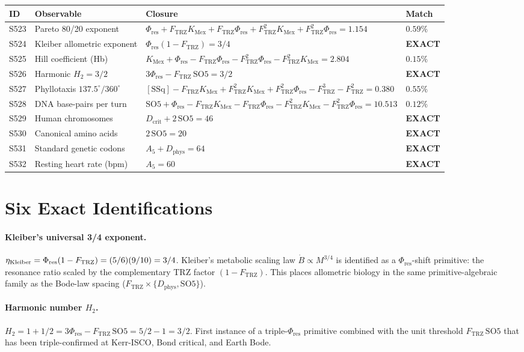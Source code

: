 \documentclass[11pt]{article}
\newcommand{\Ftrz}{F_{\mathrm{TRZ}}}
\newcommand{\Phires}{\Phi_{\mathrm{res}}}
\newcommand{\KMex}{K_{\mathrm{Mex}}}
\newcommand{\Dphys}{D_{\mathrm{phys}}}
\newcommand{\Dcrit}{D_{\mathrm{crit}}}
\newcommand{\SOfive}{\mathrm{SO5}}
\newcommand{\Afive}{A_{5}}
\newcommand{\SSq}{[\mathrm{SSq}]}
\begin{document}
\begin{longtable}{@{}llll@{}}
\toprule
ID & Observable & Closure & Match \\
\midrule
\endhead
S523 & Pareto 80/20 exponent & $\Phires+\Ftrz\KMex+\Ftrz\Phires+\Ftrz^2\KMex+\Ftrz^2\Phires=1.154$ & $0.59\%$ \\
S524 & Kleiber allometric exponent & $\Phires(1-\Ftrz) = 3/4$ & \textbf{EXACT} \\
S525 & Hill coefficient (Hb) & $\KMex+\Phires-\Ftrz\Phires-\Ftrz^2\Phires-\Ftrz^2\KMex=2.804$ & $0.15\%$ \\
S526 & Harmonic $H_2 = 3/2$ & $3\Phires-\Ftrz\,\SOfive = 3/2$ & \textbf{EXACT} \\
S527 & Phyllotaxis $137.5^\circ/360^\circ$ & $\SSq-\Ftrz\KMex+\Ftrz^2\KMex+\Ftrz^2\Phires-\Ftrz^3-\Ftrz^2=0.380$ & $0.55\%$ \\
S528 & DNA base-pairs per turn & $\SOfive+\Phires-\Ftrz\KMex-\Ftrz\Phires-\Ftrz^2\KMex-\Ftrz^2\Phires=10.513$ & $0.12\%$ \\
S529 & Human chromosomes & $\Dcrit + 2\,\SOfive = 46$ & \textbf{EXACT} \\
S530 & Canonical amino acids & $2\,\SOfive = 20$ & \textbf{EXACT} \\
S531 & Standard genetic codons & $\Afive + \Dphys = 64$ & \textbf{EXACT} \\
S532 & Resting heart rate (bpm) & $\Afive = 60$ & \textbf{EXACT} \\
\bottomrule
\end{longtable}

\section{Six Exact Identifications}

\paragraph{Kleiber's universal 3/4 exponent.}
$\eta_{\rm Kleiber} = \Phires(1-\Ftrz) = (5/6)(9/10) = 3/4$.
Kleiber's metabolic scaling law $\dot{B} \propto M^{3/4}$ is identified
as a $\Phires$-shift primitive: the resonance ratio scaled by the
complementary TRZ factor $(1-\Ftrz)$. This places allometric biology in
the same primitive-algebraic family as the Bode-law spacing
($\Ftrz \times \{\Dphys,\SOfive\}$).

\paragraph{Harmonic number $H_2$.}
$H_2 = 1 + 1/2 = 3\Phires - \Ftrz\,\SOfive = 5/2 - 1 = 3/2$.
First instance of a triple-$\Phires$ primitive combined with the unit
threshold $\Ftrz\,\SOfive$ that has been triple-confirmed at Kerr-ISCO,
Bond critical, and Earth Bode.
\end{document}
